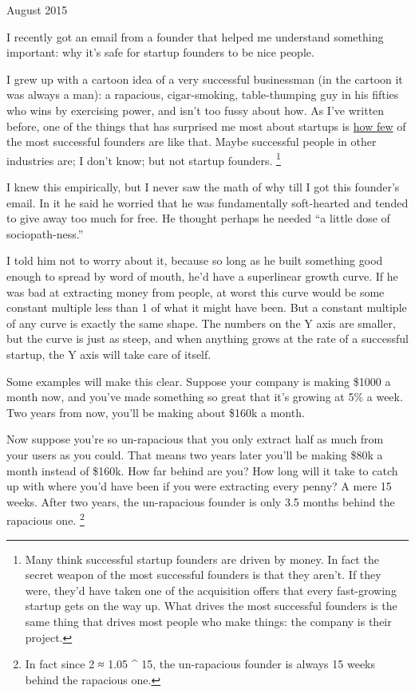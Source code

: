 \documentclass[12pt]{book}
\begin{document}
August 2015

I recently got an email from a founder that helped me understand
something important: why it's safe for startup founders to be nice
people.

I grew up with a cartoon idea of a very successful businessman (in the
cartoon it was always a man): a rapacious, cigar-smoking, table-thumping
guy in his fifties who wins by exercising power, and isn't too fussy
about how. As I've written before, one of the things that has surprised
me most about startups is \href{mean.html}{how few} of the most
successful founders are like that. Maybe successful people in other
industries are; I don't know; but not startup founders.
\footnote{Many think successful startup founders are driven by money. In
fact the secret weapon of the most successful founders is that they
aren't. If they were, they'd have taken one of the acquisition offers
that every fast-growing startup gets on the way up. What drives the most
successful founders is the same thing that drives most people who make
things: the company is their project.}

I knew this empirically, but I never saw the math of why till I got this
founder's email. In it he said he worried that he was fundamentally
soft-hearted and tended to give away too much for free. He thought
perhaps he needed ``a little dose of sociopath-ness.''

I told him not to worry about it, because so long as he built something
good enough to spread by word of mouth, he'd have a superlinear growth
curve. If he was bad at extracting money from people, at worst this
curve would be some constant multiple less than 1 of what it might have
been. But a constant multiple of any curve is exactly the same shape.
The numbers on the Y axis are smaller, but the curve is just as steep,
and when anything grows at the rate of a successful startup, the Y axis
will take care of itself.

Some examples will make this clear. Suppose your company is making
\$1000 a month now, and you've made something so great that it's growing
at 5\% a week. Two years from now, you'll be making about \$160k a
month.

Now suppose you're so un-rapacious that you only extract half as much
from your users as you could. That means two years later you'll be
making \$80k a month instead of \$160k. How far behind are you? How long
will it take to catch up with where you'd have been if you were
extracting every penny? A mere 15 weeks. After two years, the
un-rapacious founder is only 3.5 months behind the rapacious one.
\footnote{In fact since 2 ≈ 1.05 \^{} 15, the un-rapacious founder is
always 15 weeks behind the rapacious one.}
\end{document}
